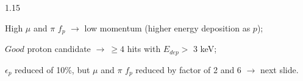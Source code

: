 \documentclass{beamer}
\begin{document}
\begin{frame}
\begin{columns}
\begin{column}{1.15\framewidth}
\begin{itemize}
{\vspace{1mm}
\item High $\mu$ and $\pi$ $f_p$ $\rightarrow$ low momentum (higher energy deposition as $p$);
\vspace{1mm}
\item $Good$ proton candidate $\rightarrow \ \geq 4$
hits with $E_{dep} >$ 3 keV; 
\vspace{1mm}
\item $\epsilon_p$ reduced of 10\%, but $\mu$ and $\pi$ $f_p$ reduced by factor of 2 and 6 $\rightarrow$ next slide.
}
      \end{itemize}
      \end{column}
      \end{columns}
\end{frame}
\end{document}
